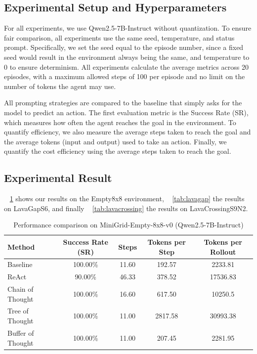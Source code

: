 \subsection{Experimental Setup and Hyperparameters} For all experiments, we use Qwen2.5-7B-Instruct without quantization. To ensure fair comparison, all experiments use the same seed, temperature, and status prompt. Specifically, we set the seed equal to the episode number, since a fixed seed would result in the environment always being the same, and temperature to 0 to ensure determinism. All experiments calculate the average metrics across 20 episodes, with a maximum allowed steps of 100 per episode and no limit on the number of tokens the agent may use. 

All prompting strategies are compared to the baseline that simply asks for the model to predict an action. The first evaluation metric is the Success Rate (SR), which measures how often the agent reaches the goal in the environment. To quantify efficiency, we also measure the average steps taken to reach the goal and the average tokens (input and output) used to take an action. Finally, we quantify the cost efficiency using the average steps taken to reach the goal. 

\subsection{Experimental Result}

\tableautorefname~ \ref{tab:empty8x8} shows our results on the Empty8x8 environment, \tableautorefname~ \ref{tab:lavagap} the results on LavaGapS6, and finally \tableautorefname~ \ref{tab:lavacrossing} the results on LavaCrossingS9N2.

\begin{table}[h!]
\centering
\caption{Performance comparison on MiniGrid-Empty-8x8-v0 (Qwen2.5-7B-Instruct)}
\label{tab:empty8x8}
\begin{tabular}{lcccc}
\toprule
Method & Success Rate (SR) & Steps & Tokens per Step & Tokens per Rollout\\
\midrule
Baseline           & 100.00\% & 11.60 & 192.57 & 2233.81\\
ReAct              &  90.00\% & 46.33 & 378.52 & 17536.83\\
Chain of Thought   & 100.00\% & 16.60 & 617.50 & 10250.5\\
Tree of Thought    & 100.00\% & 11.00 & 2817.58 & 30993.38\\
Buffer of Thought  & 100.00\% & 11.00 & 207.45 & 2281.95\\
\bottomrule
\end{tabular}
\end{table}

